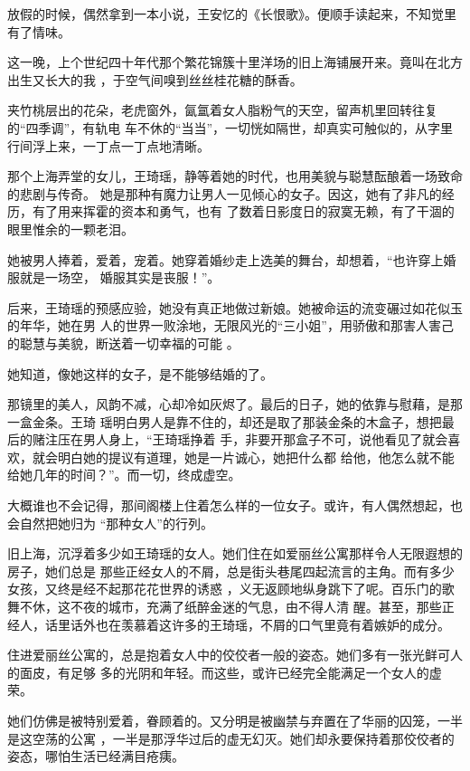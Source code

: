 \documentclass[12pt,a4paper]{article}
\begin{document}
	\endwriting



		放假的时候，偶然拿到一本小说，王安忆的《长恨歌》。便顺手读起来，不知觉里有了情味。

		这一晚，上个世纪四十年代那个繁花锦簇十里洋场的旧上海铺展开来。竟叫在北方出生又长大的我
	，于空气间嗅到丝丝桂花糖的酥香。

		夹竹桃层出的花朵，老虎窗外，氤氲着女人脂粉气的天空，留声机里回转往复的“四季调”，有轨电
	车不休的“当当”，一切恍如隔世，却真实可触似的，从字里行间浮上来，一丁点一丁点地清晰。

		那个上海弄堂的女儿，王琦瑶，静等着她的时代，也用美貌与聪慧酝酿着一场致命的悲剧与传奇。
	她是那种有魔力让男人一见倾心的女子。因这，她有了非凡的经历，有了用来挥霍的资本和勇气，也有
	了数着日影度日的寂寞无赖，有了干涸的眼里惟余的一颗老泪。

		她被男人捧着，爱着，宠着。她穿着婚纱走上选美的舞台，却想着，“也许穿上婚服就是一场空，
	婚服其实是丧服！”。

		后来，王琦瑶的预感应验，她没有真正地做过新娘。她被命运的流变碾过如花似玉的年华，她在男
	人的世界一败涂地，无限风光的“三小姐”，用骄傲和那害人害己的聪慧与美貌，断送着一切幸福的可能
	。

		她知道，像她这样的女子，是不能够结婚的了。

		那镜里的美人，风韵不减，心却冷如灰烬了。最后的日子，她的依靠与慰藉，是那一盒金条。王琦
	瑶明白男人是靠不住的，却还是取了那装金条的木盒子，想把最后的赌注压在男人身上，“王琦瑶挣着
	手，非要开那盒子不可，说他看见了就会喜欢，就会明白她的提议有道理，她是一片诚心，她把什么都
	给他，他怎么就不能给她几年的时间？”。而一切，终成虚空。

		大概谁也不会记得，那间阁楼上住着怎么样的一位女子。或许，有人偶然想起，也会自然把她归为
	“那种女人”的行列。

		旧上海，沉浮着多少如王琦瑶的女人。她们住在如爱丽丝公寓那样令人无限遐想的房子，她们总是
	那些正经女人的不屑，总是街头巷尾四起流言的主角。而有多少女孩，又终是经不起那花花世界的诱惑
	，义无返顾地纵身跳下了呢。百乐门的歌舞不休，这不夜的城市，充满了纸醉金迷的气息，由不得人清
	醒。甚至，那些正经人，话里话外也在羡慕着这许多的王琦瑶，不屑的口气里竟有着嫉妒的成分。

		住进爱丽丝公寓的，总是抱着女人中的佼佼者一般的姿态。她们多有一张光鲜可人的面皮，有足够
	多的光阴和年轻。而这些，或许已经完全能满足一个女人的虚荣。

		她们仿佛是被特别爱着，眷顾着的。又分明是被幽禁与弃置在了华丽的囚笼，一半是这空荡的公寓
	，一半是那浮华过后的虚无幻灭。她们却永要保持着那佼佼者的姿态，哪怕生活已经满目疮痍。
\end{document}
